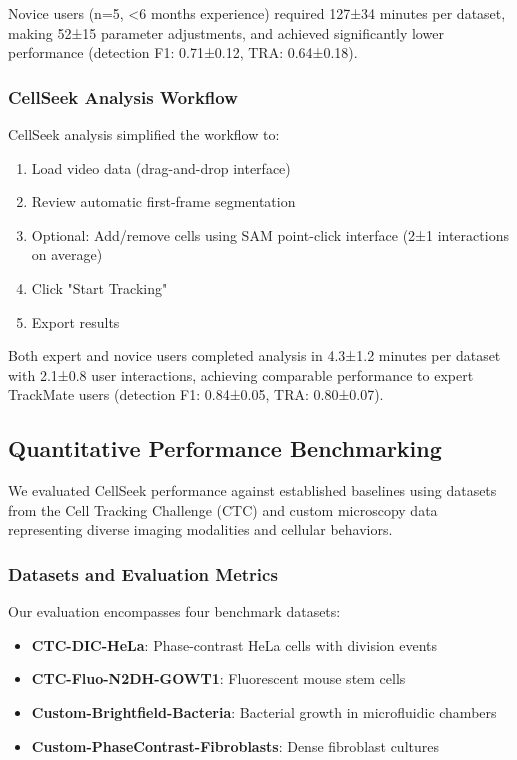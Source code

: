 \documentclass[12pt]{article}
\begin{document}
Novice users (n=5, <6 months experience) required 127±34 minutes per dataset, making 52±15 parameter adjustments, and achieved significantly lower performance (detection F1: 0.71±0.12, TRA: 0.64±0.18).

\subsubsection{CellSeek Analysis Workflow}

CellSeek analysis simplified the workflow to:
\begin{enumerate}
  \item Load video data (drag-and-drop interface)
  \item Review automatic first-frame segmentation
  \item Optional: Add/remove cells using SAM point-click interface (2±1 interactions on average)
  \item Click "Start Tracking"
  \item Export results
\end{enumerate}

Both expert and novice users completed analysis in 4.3±1.2 minutes per dataset with 2.1±0.8 user interactions, achieving comparable performance to expert TrackMate users (detection F1: 0.84±0.05, TRA: 0.80±0.07).

\subsection{Quantitative Performance Benchmarking}

We evaluated CellSeek performance against established baselines using datasets from the Cell Tracking Challenge (CTC) and custom microscopy data representing diverse imaging modalities and cellular behaviors.

\subsubsection{Datasets and Evaluation Metrics}

Our evaluation encompasses four benchmark datasets:
\begin{itemize}
  \item \textbf{CTC-DIC-HeLa}: Phase-contrast HeLa cells with division events
  \item \textbf{CTC-Fluo-N2DH-GOWT1}: Fluorescent mouse stem cells
  \item \textbf{Custom-Brightfield-Bacteria}: Bacterial growth in microfluidic chambers
  \item \textbf{Custom-PhaseContrast-Fibroblasts}: Dense fibroblast cultures
\end{itemize}
\end{document}
